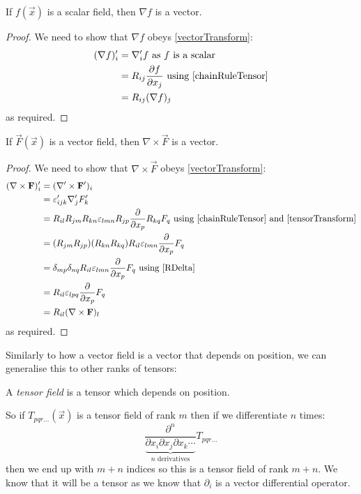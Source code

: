\documentclass[../main.tex]{subfiles}
\begin{document}
\begin{lemma}
  If $f(\vec{x})$ is a scalar field, then $\nabla f$ is a vector.
\end{lemma}
\begin{proof}
  We need to show that $\nabla f$ obeys \cref{vectorTransform}:
  \begin{align*}
    (\nabla f)_i' &= \nabla'_i f \text{ as $f$ is a scalar} \\
                  &= R_{i j}\pderiv{f}{x_j} \text{ using \cref{chainRuleTensor}} \\
                  &= R_{i j}(\nabla f)_j
  \end{align*}
  as required.
\end{proof}
\begin{lemma}
  If $\vec{F}(\vec{x})$ is a vector field, then $\nabla \times \vec{F}$ is a vector.
\end{lemma}
\begin{proof}
  We need to show that $\nabla \times \vec{F}$ obeys \cref{vectorTransform}:
  \begin{align*}
    (\nabla \times \vec{F})'_i &= (\nabla' \times \vec{F}')_i \\
                               &= \levi_{i j k}'\nabla'_j F_k' \\
                               &= R_{i l}R_{j m}R_{k n}\levi_{l m n} R_{j p} \pderiv{}{x_p} R_{k q}F_{q} \text{ using \cref{chainRuleTensor} and \cref{tensorTransform}} \\
                               &= (R_{j m}R_{j p})(R_{k n}R_{k q})R_{i l} \levi_{l m n} \pderiv{}{x_p}F_q \\
                               &= \delta_{m p}\delta_{n q} R_{i l} \levi_{l m n} \pderiv{}{x_p}F_q \text{ using \cref{RDelta}} \\
                               &= R_{i l}\levi_{l p q} \pderiv{}{x_p}F_q \\
                               &= R_{i l}(\nabla \times \vec{F})_l
  \end{align*}
  as required.
\end{proof}
Similarly to how a vector field is a vector that depends on position, we can generalise this to other ranks of tensors:
\begin{definition}
  A \textit{tensor field} is a tensor which depends on position.
\end{definition}
So if $T_{p q r \ldots}(\vec{x})$ is a tensor field of rank $m$ then if we differentiate $n$ times:
\[
  \frac{\partial^{n}}{\underbrace{\partial x_i \partial x_j \partial x_k \cdots}_{n \text{ derivatives}}} T_{p q r \ldots}
\]
then we end up with $m + n$ indices so this is a tensor field of rank $m + n$.
We know that it will be a tensor as we know that $\partial_i$ is a vector differential operator.
\end{document}
